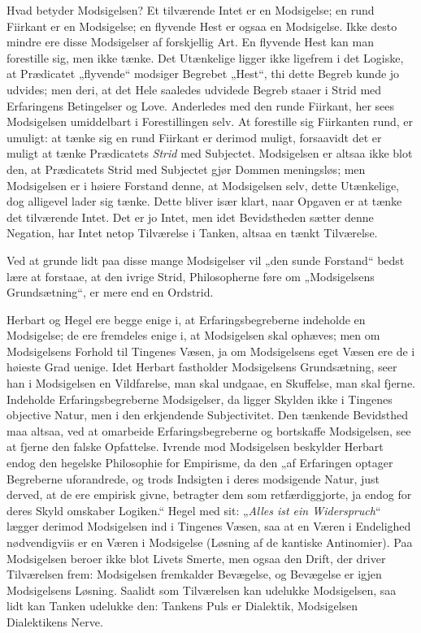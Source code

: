 \documentclass[12pt]{book}
\newcommand{\opage}[1]{\marginnote{\footnotesize\textit{[#1]}}}
\begin{document}
Hvad betyder Modsigelsen? Et tilværende Intet er en Modsigelse; en rund Fiirkant er en
Modsigelse; en flyvende Hest er ogsaa en Modsigelse. Ikke desto mindre ere disse
Modsigelser af forskjellig Art. En flyvende Hest kan man forestille sig, men ikke
tænke. Det Utænkelige ligger ikke ligefrem i det Logiske, at Prædicatet „flyvende“
modsiger Begrebet „Hest“, thi dette Begreb kunde jo udvides; men deri, at det Hele
saaledes udvidede Begreb staaer i Strid med Erfaringens Betingelser og Love.
Anderledes med den runde Fiirkant, her sees Modsigelsen umiddelbart i Forestillingen
selv. At forestille sig Fiirkanten rund, er umuligt: at tænke sig en rund Fiirkant er
derimod muligt, forsaavidt det er muligt at tænke Prædicatets \emph{Strid} med
Subjectet. Modsigelsen er altsaa ikke blot den, at Prædicatets Strid med Subjectet
gjør Dommen meningsløs; men Modsigelsen er i høiere Forstand denne, at Modsigelsen
selv, dette Utænkelige, dog alligevel lader sig tænke. Dette
\opage{44} bliver især klart, naar Opgaven er at tænke det tilværende Intet. Det er jo Intet,
men idet Bevidstheden sætter denne Negation, har Intet netop Tilværelse i Tanken,
altsaa en tænkt Tilværelse.

Ved at grunde lidt paa disse mange Modsigelser vil „den sunde Forstand“ bedst lære at
forstaae, at den ivrige Strid, Philosopherne føre om „Modsigelsens Grundsætning“, er
mere end en Ordstrid.

Herbart og Hegel ere begge enige i, at Erfaringsbegreberne indeholde en Modsigelse; de
ere fremdeles enige i, at Modsigelsen skal ophæves; men om Modsigelsens Forhold til
Tingenes Væsen, ja om Modsigelsens eget Væsen ere de i høieste Grad uenige. Idet
Herbart fastholder Modsigelsens Grundsætning, seer han i Modsigelsen en Vildfarelse,
man skal undgaae, en Skuffelse, man skal fjerne. Indeholde Erfaringsbegreberne
Modsigelser, da ligger Skylden ikke i Tingenes objective Natur, men i den erkjendende
Subjectivitet. Den tænkende Bevidsthed maa altsaa, ved at omarbeide
Erfaringsbegreberne og bortskaffe Modsigelsen, see at fjerne den falske Opfattelse.
Ivrende mod Modsigelsen beskylder Herbart endog den hegelske Philosophie for
Empirisme, da den „af Erfaringen optager Begreberne uforandrede, og trods Indsigten i
deres modsigende Natur, just derved, at de ere empirisk givne, betragter dem som
retfærdiggjorte, ja endog for deres Skyld omskaber Logiken.“ Hegel med sit:
„\textit{Alles ist ein Widerspruch}“ lægger derimod Modsigelsen ind i Tingenes Væsen,
saa at en Væren i Endelighed nødvendigviis er en Væren i Modsigelse (Løsning af de
kantiske Antinomier). Paa Modsigelsen beroer ikke blot Livets Smerte, men ogsaa den
Drift, der driver Tilværelsen frem: Modsigelsen fremkalder Bevægelse, og Bevægelse er
igjen Modsigelsens Løsning. Saalidt som Tilværelsen kan udelukke Modsigelsen, saa lidt
kan Tanken udelukke den: Tankens Puls er Dialektik, Modsigelsen Dialektikens Nerve.
\end{document}
